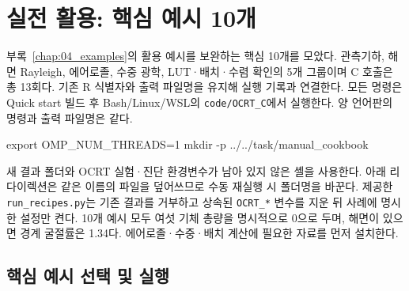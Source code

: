 
\chapter{실전 활용: 핵심 예시 10개}

\label{chap:09_cookbook}

부록~\ref{chap:04_examples}의 활용 예시를 보완하는 핵심 10개를 모았다. 관측기하, 해면 Rayleigh, 에어로졸, 수중 광학, LUT·배치·수렴 확인의 5개 그룹이며 C 호출은 총 13회다. 기존 R 식별자와 출력 파일명을 유지해 실행 기록과 연결한다. 모든 명령은 Quick start 빌드 후 Bash/Linux/WSL의 \texttt{code/\allowbreak{}OCRT\_\allowbreak{}C}에서 실행한다. 양 언어판의 명령과 출력 파일명은 같다.

\noindent\begin{minipage}{\linewidth}
\begin{ManualCode}

export OMP_NUM_THREADS=1
mkdir -p ../../task/manual_cookbook

\end{ManualCode}
\end{minipage}\par

새 결과 폴더와 OCRT 실험·진단 환경변수가 남아 있지 않은 셸을 사용한다. 아래 리다이렉션은 같은 이름의 파일을 덮어쓰므로 수동 재실행 시 폴더명을 바꾼다. 제공한 \texttt{run\_\allowbreak{}recipes.py}는 기존 결과를 거부하고 상속된 \texttt{OCRT\_\allowbreak{}*} 변수를 지운 뒤 사례에 명시한 설정만 켠다. 10개 예시 모두 여섯 기체 총량을 명시적으로 0으로 두며, 해면이 있으면 경계 굴절률은 1.34다. 에어로졸·수중·배치 계산에 필요한 자료를 먼저 설치한다.

\clearpage

\section{핵심 예시 선택 및 실행}

\label{sec:auto:09_cookbook:1}

\label{sec:cookbook_selection}

